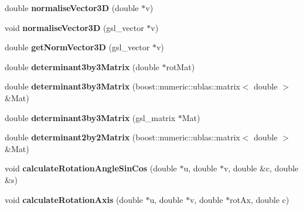 \begin{DoxyCompactItemize}
\item 
\hypertarget{classShapeBase_aeedf5dc5bdb68820c143ee5ef75c01a9}{}double {\bfseries normalise\+Vector3\+D} (double $\ast$v)\label{classShapeBase_aeedf5dc5bdb68820c143ee5ef75c01a9}

\item 
\hypertarget{classShapeBase_a9e7ca6bbc30107ed82e73694f9c34717}{}void {\bfseries normalise\+Vector3\+D} (gsl\+\_\+vector $\ast$v)\label{classShapeBase_a9e7ca6bbc30107ed82e73694f9c34717}

\item 
\hypertarget{classShapeBase_a38c436dca2006e445f7949bc34f08e3c}{}double {\bfseries get\+Norm\+Vector3\+D} (gsl\+\_\+vector $\ast$v)\label{classShapeBase_a38c436dca2006e445f7949bc34f08e3c}

\item 
\hypertarget{classShapeBase_ade98a5910e7b81ee22da6bcb91262328}{}double {\bfseries determinant3by3\+Matrix} (double $\ast$rot\+Mat)\label{classShapeBase_ade98a5910e7b81ee22da6bcb91262328}

\item 
\hypertarget{classShapeBase_ad86161effaf1c7c607aba51609a99e70}{}double {\bfseries determinant3by3\+Matrix} (boost\+::numeric\+::ublas\+::matrix$<$ double $>$ \&Mat)\label{classShapeBase_ad86161effaf1c7c607aba51609a99e70}

\item 
\hypertarget{classShapeBase_af52dce091d2e8369f546df9adeb1e6c0}{}double {\bfseries determinant3by3\+Matrix} (gsl\+\_\+matrix $\ast$Mat)\label{classShapeBase_af52dce091d2e8369f546df9adeb1e6c0}

\item 
\hypertarget{classShapeBase_a32f1a594c4be91e71f567cc04290a7f5}{}double {\bfseries determinant2by2\+Matrix} (boost\+::numeric\+::ublas\+::matrix$<$ double $>$ \&Mat)\label{classShapeBase_a32f1a594c4be91e71f567cc04290a7f5}

\item 
\hypertarget{classShapeBase_a7c656b4d72103a222e3d9d4d4dc636ca}{}void {\bfseries calculate\+Rotation\+Angle\+Sin\+Cos} (double $\ast$u, double $\ast$v, double \&c, double \&s)\label{classShapeBase_a7c656b4d72103a222e3d9d4d4dc636ca}

\item 
\hypertarget{classShapeBase_acfd90d8e14946c7246e4420ca0ab6a0a}{}void {\bfseries calculate\+Rotation\+Axis} (double $\ast$u, double $\ast$v, double $\ast$rot\+Ax, double c)\label{classShapeBase_acfd90d8e14946c7246e4420ca0ab6a0a}


\end{DoxyCompactItemize}
